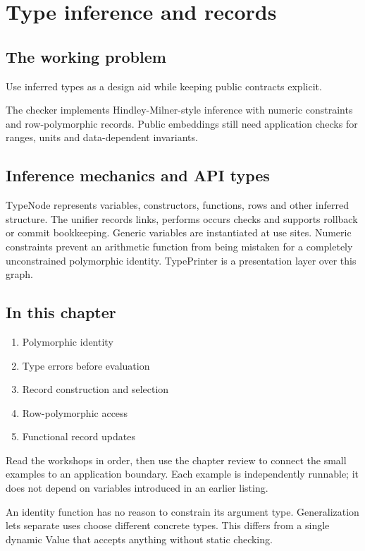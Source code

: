 \chapter{Type inference and records}\label{ch:16}
\section*{The working problem}
Use inferred types as a design aid while keeping public contracts explicit.

The checker implements Hindley-Milner-style inference with numeric constraints and row-polymorphic records. Public embeddings still need application checks for ranges, units and data-dependent invariants.

\section*{Inference mechanics and API types}
TypeNode represents variables, constructors, functions, rows and other inferred structure. The unifier records links, performs occurs checks and supports rollback or commit bookkeeping. Generic variables are instantiated at use sites. Numeric constraints prevent an arithmetic function from being mistaken for a completely unconstrained polymorphic identity. TypePrinter is a presentation layer over this graph.

\section*{In this chapter}
\begin{enumerate}
\item Polymorphic identity
\item Type errors before evaluation
\item Record construction and selection
\item Row-polymorphic access
\item Functional record updates
\end{enumerate}
Read the workshops in order, then use the chapter review to connect the small examples to an application boundary. Each example is independently runnable; it does not depend on variables introduced in an earlier listing.

\clearpage
{}
An identity function has no reason to constrain its argument type. Generalization lets separate uses choose different concrete types. This differs from a single dynamic Value that accepts anything without static checking.

